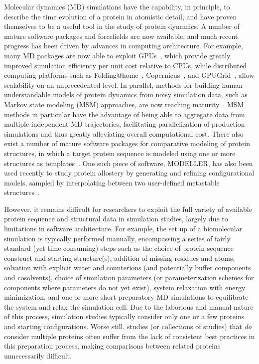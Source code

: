 \documentclass[aps,prl,preprint,nofootinbib,superscriptaddress,linenumbers]{revtex4-1}
\begin{document}
Molecular dynamics (MD) simulations have the capability, in principle, to describe the time evolution of a protein in atomistic detail, and have proven themselves to be a useful tool in the study of protein dynamics.
A number of mature software packages and forcefields are now available, and much recent progress has been driven by advances in computing architecture.
For example, many MD packages are now able to exploit GPUs~\cite{eastman:jctc:2012:openmm,walker:jctc:2013:amber-gpu}, which provide greatly improved simulation efficiency per unit cost relative to CPUs, while distributed computing platforms such as Folding@home~\cite{shirts-pande:science:2000:fah}, Copernicus~\cite{pronk:2011:copernicus,pronk:2015:copernicus}, and GPUGrid~\cite{buch:2010:gpugrid}, allow scalability on an unprecedented level.
In parallel, methods for building human-understandable models of protein dynamics from noisy simulation data, such as Markov state modeling (MSM) approaches, are now reaching maturity~\cite{pande-beauchamp-bowman:2010:methods:markov-model-review,noe:jcp:2011:msm-review,chodera-noe:curr-opin-struct-biol:2014:msm-review}.
MSM methods in particular have the advantage of being able to aggregate data from multiple independent MD trajectories, facilitating parallelization of production simulations and thus greatly alleviating overall computational cost.
There also exist a number of mature software packages for comparative modeling of protein structures, in which a target protein sequence is modeled using one or more structures as templates~\cite{moult:proteins:2014:casp10,baker:science:2001:structure-prediction-review}.
One such piece of software, MODELLER, has also been used recently to study protein allostery by generating and refining configurational models, sampled by interpolating between two user-defined metastable structures~\cite{sali:2012:allostery-modeling}.

However, it remains difficult for researchers to exploit the full variety of available protein sequence and structural data in simulation studies, largely due to limitations in software architecture.
For example, the set up of a biomolecular simulation is typically performed manually, encompassing a series of fairly standard (yet time-consuming) steps such as the choice of protein sequence construct and starting structure(s), addition of missing residues and atoms, solvation with explicit water and counterions (and potentially buffer components and cosolvents), choice of simulation parameters (or parameterization schemes for components where parameters do not yet exist),  system relaxation with energy minimization, and one or more short preparatory MD simulations to equilibrate the system and relax the simulation cell.
Due to the laborious and manual nature of this process, simulation studies typically consider only one or a few proteins and starting configurations.
Worse still, studies (or collections of studies) that \emph{do} consider multiple proteins often suffer from the lack of consistent best practices in this preparation process, making comparisons between related proteins unnecessarily difficult.
\end{document}
